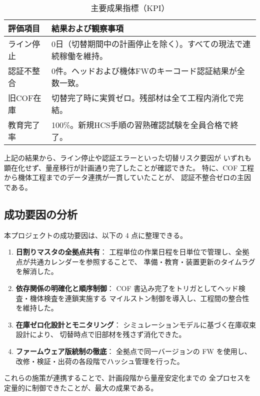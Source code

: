 \documentclass[journal,twocolumn]{IEEEtran}
\begin{document}
\begin{table}[t]
\caption{主要成果指標（KPI）}
\label{tab:result}
\centering
\begin{tabularx}{\columnwidth}{@{}l X@{}}
\toprule
評価項目 & 結果および観察事項 \\
\midrule
ライン停止 & 0日（切替期間中の計画停止を除く）。すべての現法で連続稼働を維持。 \\[2pt]
認証不整合 & 0件。ヘッドおよび機体FWのキーコード認証結果が全数一致。 \\[2pt]
旧COF在庫 & 切替完了時に実質ゼロ。残部材は全て工程内消化で完結。 \\[2pt]
教育完了率 & 100\%。新規HCS手順の習熟確認試験を全員合格で終了。 \\
\bottomrule
\end{tabularx}
\end{table}

上記の結果から、ライン停止や認証エラーといった切替リスク要因が
いずれも顕在化せず、量産移行が計画通り完了したことが確認できた。
特に、COF 工程から機体工程までのデータ連携が一貫していたことが、
認証不整合ゼロの主因である。

\subsection{成功要因の分析}
本プロジェクトの成功要因は、以下の 4 点に整理できる。

\begin{enumerate}
  \item \textbf{日割りマスタの全拠点共有}：  
  工程単位の作業日程を日単位で管理し、全拠点が共通カレンダーを参照することで、
  準備・教育・装置更新のタイムラグを解消した。
  
  \item \textbf{依存関係の明確化と順序制御}：  
  COF 書込み完了をトリガとしてヘッド検査・機体検査を連鎖実施する
  マイルストン制御を導入し、工程間の整合性を維持した。
  
  \item \textbf{在庫ゼロ化設計とモニタリング}：  
  シミュレーションモデルに基づく在庫収束設計により、
  切替時点で旧部材を残さず消化できた。
  
  \item \textbf{ファームウェア版統制の徹底}：  
  全拠点で同一バージョンの FW を使用し、
  改修・検証・出荷の各段階でハッシュ管理を行った。
\end{enumerate}

これらの施策が連携することで、計画段階から量産安定化までの
全プロセスを定量的に制御できたことが、最大の成果である。
\end{document}
